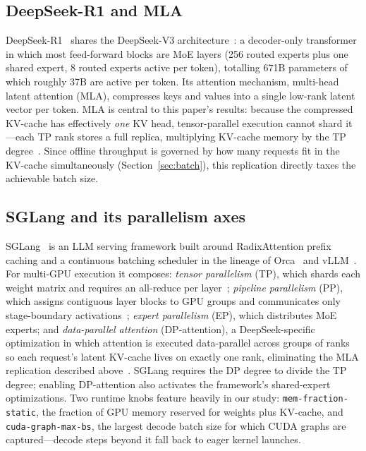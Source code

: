 \documentclass[sigconf]{acmart}
\begin{document}
\subsection{DeepSeek-R1 and MLA}
DeepSeek-R1~\cite{deepseekr1} shares the DeepSeek-V3 architecture~\cite{deepseekv3}: a decoder-only transformer in which most feed-forward blocks are MoE layers (256 routed experts plus one shared expert, 8 routed experts active per token), totalling 671B parameters of which roughly 37B are active per token. Its attention mechanism, multi-head latent attention (MLA), compresses keys and values into a single low-rank latent vector per token. MLA is central to this paper's results: because the compressed KV-cache has effectively \emph{one} KV head, tensor-parallel execution cannot shard it---each TP rank stores a full replica, multiplying KV-cache memory by the TP degree~\cite{sglangv04blog}. Since offline throughput is governed by how many requests fit in the KV-cache simultaneously (Section~\ref{sec:batch}), this replication directly taxes the achievable batch size.

\subsection{SGLang and its parallelism axes}
SGLang~\cite{zheng2024sglang} is an LLM serving framework built around RadixAttention prefix caching and a continuous batching scheduler in the lineage of Orca~\cite{yu2022orca} and vLLM~\cite{kwon2023vllm}. For multi-GPU execution it composes: \emph{tensor parallelism} (TP), which shards each weight matrix and requires an all-reduce per layer~\cite{shoeybi2019megatron}; \emph{pipeline parallelism} (PP), which assigns contiguous layer blocks to GPU groups and communicates only stage-boundary activations~\cite{huang2019gpipe}; \emph{expert parallelism} (EP), which distributes MoE experts; and \emph{data-parallel attention} (DP-attention), a DeepSeek-specific optimization in which attention is executed data-parallel across groups of ranks so each request's latent KV-cache lives on exactly one rank, eliminating the MLA replication described above~\cite{sglangv04blog}. SGLang requires the DP degree to divide the TP degree; enabling DP-attention also activates the framework's shared-expert optimizations. Two runtime knobs feature heavily in our study: \texttt{mem-fraction-static}, the fraction of GPU memory reserved for weights plus KV-cache, and \texttt{cuda-graph-max-bs}, the largest decode batch size for which CUDA graphs are captured---decode steps beyond it fall back to eager kernel launches.
\end{document}

